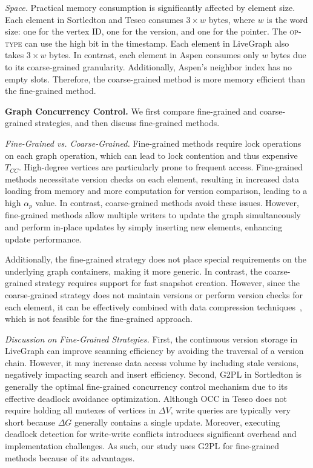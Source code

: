 \emph{Space.} Practical memory consumption is significantly affected by element size. Each element in Sortledton and Teseo consumes $3 \times w$ bytes, where $w$ is the word size: one for the vertex ID, one for the version, and one for the pointer. The \textsc{op-type} can use the high bit in the timestamp. Each element in LiveGraph also takes $3 \times w$ bytes. In contrast, each element in Aspen consumes only $w$ bytes due to its coarse-grained granularity. Additionally, Aspen’s neighbor index has no empty slots. Therefore, the coarse-grained method is more memory efficient than the fine-grained method.

\vspace{2pt}
\noindent\textbf{Graph Concurrency Control.} We first compare fine-grained and coarse-grained strategies, and then discuss fine-grained methods.

\emph{Fine-Grained vs. Coarse-Grained.} Fine-grained methods require lock operations on each graph operation, which can lead to lock contention and thus expensive $T_{CC}$. High-degree vertices are particularly prone to frequent access. Fine-grained methods necessitate version checks on each element, resulting in increased data loading from memory and more computation for version comparison, leading to a high $\alpha_p$ value. In contrast, coarse-grained methods avoid these issues. However, fine-grained methods allow multiple writers to update the graph simultaneously and perform in-place updates by simply inserting new elements, enhancing update performance.

Additionally, the fine-grained strategy does not place special requirements on the underlying graph containers, making it more generic. In contrast, the coarse-grained strategy requires support for fast snapshot creation. However, since the coarse-grained strategy does not maintain versions or perform version checks for each element, it can be effectively combined with data compression techniques~\cite{dhulipala2019low}, which is not feasible for the fine-grained approach.

\emph{Discussion on Fine-Grained Strategies.} First, the continuous version storage in LiveGraph can improve scanning efficiency by avoiding the traversal of a version chain. However, it may increase data access volume by including stale versions, negatively impacting search and insert efficiency. Second, G2PL in Sortledton is generally the optimal fine-grained concurrency control mechanism due to its effective deadlock avoidance optimization. Although OCC in Teseo does not require holding all mutexes of vertices in $\Delta V$, write queries are typically very short because $\Delta G$ generally contains a single update. Moreover, executing deadlock detection for write-write conflicts introduces significant overhead and implementation challenges. As such, our study uses G2PL for fine-grained methods because of its advantages.

